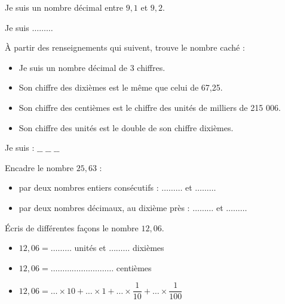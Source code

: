 \begin{pageParcoursu} 


Je suis un nombre décimal entre  $9,1$ et $9,2$.\vspace{0.3cm}

Je suis $\ldots \ldots\ldots$




À partir des renseignements qui suivent, trouve le nombre caché :

\begin{itemize}
\item  Je suis un nombre décimal de 3 chiffres.
\item  Son chiffre des dixièmes est le même que celui de 67,25.
\item  Son chiffre des centièmes est le chiffre des unités de milliers de 215 006.
\item  Son chiffre des unités est le double de son chiffre dixièmes.
\end{itemize}
 
Je suis : $\_\_$ $\_\_$ $\_\_$ 
 

Encadre le nombre $25,63$ :

\begin{itemize}
\item par deux nombres entiers consécutifs : $\ldots\ldots\ldots$ et $\ldots\ldots\ldots$ \vspace{0.3cm}
\item par deux nombres décimaux, au dixième près : $\ldots\ldots\ldots$ et $\ldots\ldots\ldots$ \vspace{0.3cm}
\end{itemize} 
 
 

Écris de différentes façons le nombre $12,06$.

\begin{itemize}
\item $12,06 = \ldots\ldots\ldots$ unités et $\ldots\ldots\ldots$ dixièmes \vspace{0.3cm}
\item $12,06 =\ldots\ldots\ldots  \ldots\ldots\ldots \ldots\ldots\ldots$ centièmes\vspace{0.2cm}
\item $12,06 =\ldots\times 10 + \ldots\times 1 + \ldots\times \dfrac{1}{10} +  \ldots\times \dfrac{1}{100}$ 
\end{itemize}


\end{pageParcoursu}
